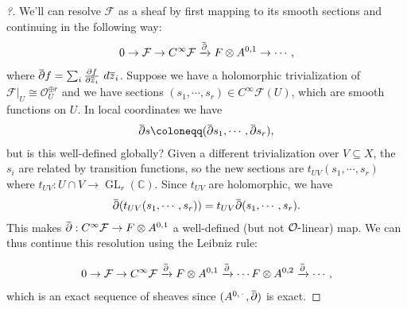 \begin{proof}[?]

We'll can resolve \(\mathcal{F}\) as a sheaf by first mapping to its
smooth sections and continuing in the following way:
\begin{align*}
0 \to \mathcal{F} \to C^{\infty } \mathcal{F} \xrightarrow{\mkern 1.5mu\overline{\mkern-1.5mu{\partial}\mkern-1.5mu}\mkern 1.5mu} F \otimes A^{0, 1} \to \cdots
,\end{align*}
where
\(\mkern 1.5mu\overline{\mkern-1.5mu{\partial}\mkern-1.5mu}\mkern 1.5muf = \sum_i {\frac{\partial f}{\partial {\overline{{z}}}_i}\,} \, d{\overline{{z}}}_i\).
Suppose we have a holomorphic trivialization of
\({ \left.{{\mathcal{F} }} \right|_{{U}} } \cong {\mathcal{O}}_{U}^{\oplus r}\)
and we have sections
\((s_1, \cdots, s_r) \in C^{\infty } \mathcal{F}(U)\), which are smooth
functions on \(U\). In local coordinates we have
\begin{align*}
\mkern 1.5mu\overline{\mkern-1.5mu{\partial}\mkern-1.5mu}\mkern 1.5mus \coloneqq(\mkern 1.5mu\overline{\mkern-1.5mu{\partial}\mkern-1.5mu}\mkern 1.5mus_1, \cdots, \mkern 1.5mu\overline{\mkern-1.5mu{\partial}\mkern-1.5mu}\mkern 1.5mus_r)
,\end{align*}
but is this well-defined globally? Given a different trivialization over
\(V \subseteq X\), the \(s_i\) are related by transition functions, so
the new sections are \(t_{UV}(s_1, \cdots, s_r)\) where
\(t_{UV}: U \cap V \to \operatorname{GL}_r({\mathbb{C}})\). Since
\(t_{UV}\) are holomorphic, we have
\begin{align*}
\mkern 1.5mu\overline{\mkern-1.5mu{\partial}\mkern-1.5mu}\mkern 1.5mu( t_{UV} (s_1, \cdots, s_r)) = t_{UV} \mkern 1.5mu\overline{\mkern-1.5mu{\partial}\mkern-1.5mu}\mkern 1.5mu(s_1, \cdots, s_r)
.\end{align*}
This makes
\(\mkern 1.5mu\overline{\mkern-1.5mu{\partial}\mkern-1.5mu}\mkern 1.5mu: C^{\infty } \mathcal{F} \to F\otimes A^{0, 1}\)
a well-defined (but not \({\mathcal{O}}{\hbox{-}}\)linear) map. We can
thus continue this resolution using the Leibniz rule:

\begin{align*}
0 \to \mathcal{F} \to C^{\infty } \mathcal{F} \xrightarrow{\mkern 1.5mu\overline{\mkern-1.5mu{\partial}\mkern-1.5mu}\mkern 1.5mu} F \otimes A^{0, 1} \xrightarrow{\mkern 1.5mu\overline{\mkern-1.5mu{\partial}\mkern-1.5mu}\mkern 1.5mu} \cdots F \otimes A^{0, 2} \xrightarrow{\mkern 1.5mu\overline{\mkern-1.5mu{\partial}\mkern-1.5mu}\mkern 1.5mu} \cdots
,\end{align*}
which is an exact sequence of sheaves since
\((A^{0, {\,\cdot\,}}, \mkern 1.5mu\overline{\mkern-1.5mu{\partial}\mkern-1.5mu}\mkern 1.5mu)\)
is exact.


\end{proof}
